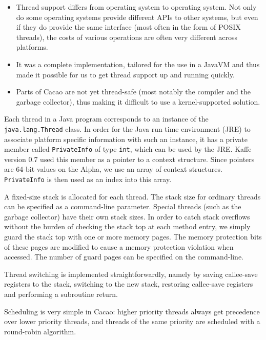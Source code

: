\begin{itemize}

\item Thread support differs from operating system to operating
system. Not only do some operating systems provide different APIs to
other systems, but even if they do provide the same interface (most
often in the form of POSIX threads), the costs of various operations
are often very different across platforms.

\item It was a complete implementation, tailored for the use in a
JavaVM and thus made it possible for us to get thread support up and
running quickly.

\item Parts of Cacao are not yet thread-safe (most notably the
compiler and the garbage collector), thus making it difficult to use a
kernel-supported solution.

\end{itemize}

Each thread in a Java program corresponds to an instance of the
\texttt{java.lang.Thread} class. In order for the Java run time
environment (JRE) to associate platform specific information with such
an instance, it has a private member called \texttt{PrivateInfo} of
type \texttt{int}, which can be used by the JRE. Kaffe version 0.7
used this member as a pointer to a context structure. Since pointers
are 64-bit values on the Alpha, we use an array of context structures.
\texttt{PrivateInfo} is then used as an index into this array.

A fixed-size stack is allocated for each thread. The stack size for
ordinary threads can be specified as a command-line parameter. Special
threads (such as the garbage collector) have their own stack sizes. In
order to catch stack overflows without the burden of checking the
stack top at each method entry, we simply guard the stack top with one
or more memory pages. The memory protection bits of these pages are
modified to cause a memory protection violation when accessed. The
number of guard pages can be specified on the command-line.

Thread switching is implemented straightforwardly, namely by saving
callee-save registers to the stack, switching to the new stack,
restoring callee-save registers and performing a subroutine return.

Scheduling is very simple in Cacao: higher priority threads always get
precedence over lower priority threads, and threads of the same
priority are scheduled with a round-robin algorithm.

